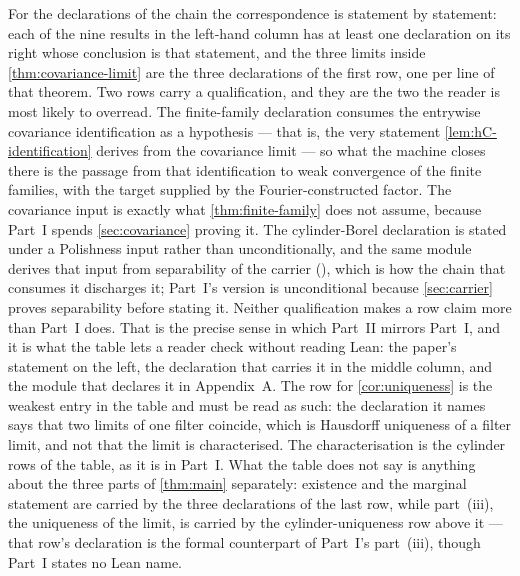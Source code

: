 For the \NumChainTheorems{} declarations of the chain the correspondence is
statement by statement: each of the nine results in the left-hand column has at
least one declaration on its right whose conclusion is that statement, and the
three limits inside \cref{thm:covariance-limit} are the three declarations of the
first row, one per line of that theorem.  Two rows carry a qualification, and
they are the two the reader is most likely to overread.
The finite-family declaration consumes the entrywise covariance identification as
a hypothesis --- that is, the very statement \cref{lem:hC-identification} derives
from the covariance limit --- so what the machine closes there is the passage from
that identification to weak convergence of the finite families, with the target
supplied by the Fourier-constructed factor.  The covariance input is exactly
what \cref{thm:finite-family} does not assume, because Part~I spends
\cref{sec:covariance} proving it.
The cylinder-Borel declaration is stated under a Polishness input rather than
unconditionally, and the same module derives that input from separability of the
carrier (), which is how the chain
that consumes it discharges it; Part~I's version is unconditional because
\cref{sec:carrier} proves separability before stating it.  Neither qualification
makes a row claim more than Part~I does.
That is the precise
sense in which Part~II mirrors
Part~I, and it is what the table lets a reader check without reading Lean: the
paper's statement on the left, the declaration that carries it in the middle
column, and the module that declares it in Appendix~A.  The row for
\cref{cor:uniqueness} is the weakest entry in the table and must be read as
such: the declaration it names says that two limits of one filter coincide,
which is Hausdorff uniqueness of a filter limit, and not that the limit is
characterised.  The characterisation is the cylinder rows of the table, as it is
in Part~I.  What the table does not
say is anything about the three parts of \cref{thm:main} separately: existence
and the marginal statement are carried by the three declarations of the last row,
while part~(iii), the uniqueness of the limit, is carried by the
cylinder-uniqueness row above it --- that row's declaration is the formal
counterpart of Part~I's part~(iii), though Part~I states no Lean name.

